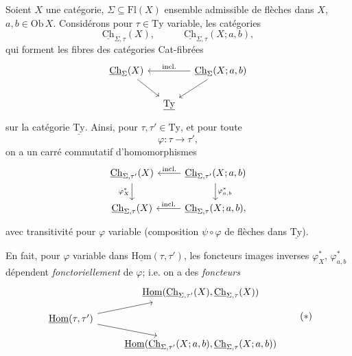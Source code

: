\documentclass[11pt]{article}
\newcommand{\printedpage}[1]{\marginpar{\footnotesize p.~#1}}
\newcommand{\msp}[1]{\marginpar{\footnotesize [#1]}}
\newcommand{\uTy}{\underline{\mathrm{Ty}}}
\newcommand{\uHom}{\underline{\mathrm{Hom}}}
\newcommand{\uCh}{\underline{\mathrm{Ch}}}
\begin{document}
Soient $X$ une catégorie, $\Sigma\subseteq\mathrm{Fl}(X)$ ensemble admissible de flèches dans $X$, $a,b\in\mathrm{Ob}\,X$. Considérons pour $\tau\in\mathrm{Ty}$ variable, les catégories
\[
\uCh_{\Sigma,\tau}(X),\qquad\quad\uCh_{\Sigma,\tau}(X;a,b),
\]
qui forment les fibres des catégories Cat-fibrées
\[
\begin{tikzcd}[column sep=small]
\uCh_\Sigma(X) \arrow[dr] & & \uCh_\Sigma(X;a,b) \arrow[ll, "\text{incl.}"'] \arrow[dl]\\
 & \uTy &
\end{tikzcd}
\]
sur la catégorie $\uTy$. Ainsi, pour $\tau,\tau'\in\mathrm{Ty}$, et pour toute
\[
\varphi:\tau\longrightarrow\tau',
\]
on a un carré commutatif d'homomorphismes
\[
\begin{tikzcd}
\uCh_{\Sigma,\tau'}(X) \arrow[d, "\varphi^*_X"'] & \uCh_{\Sigma,\tau'}(X;a,b) \arrow[l, "\text{incl.}"'] \arrow[d, "\varphi^*_{a,b}"]\\
\uCh_{\Sigma,\tau}(X) & \uCh_{\Sigma,\tau}(X;a,b), \arrow[l, "\text{incl.}"']
\end{tikzcd}
\]
avec transitivité pour $\varphi$ variable (composition $\psi\circ\varphi$ de flèches dans $\uTy$).

En fait, pour $\varphi$ variable dans $\uHom(\tau,\tau')$, les foncteurs images inverses $\varphi^*_X$, $\varphi^*_{a,b}$ dépendent \textit{fonctoriellement} de $\varphi$; i.e. on a des \textit{foncteurs}
\[
\begin{tikzcd}[row sep=small]
 & \uHom(\uCh_{\Sigma,\tau'}(X),\uCh_{\Sigma,\tau}(X))\\
\uHom(\tau,\tau') \arrow[ur] \arrow[dr] & \\
 & \uHom(\uCh_{\Sigma,\tau'}(X;a,b),\uCh_{\Sigma,\tau}(X;a,b))
\end{tikzcd}
\tag*{$(*)$}
\]

\newpage
\printedpage{61}

\msp{page 95}
\end{document}
